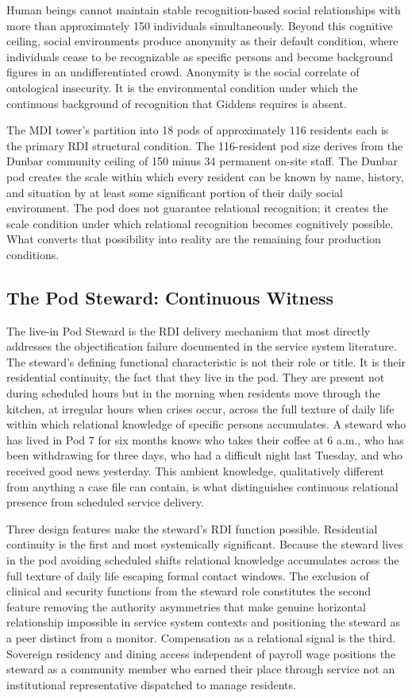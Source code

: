 \documentclass[12pt, letterpaper]{article}
\begin{document}
Human beings cannot maintain stable recognition-based social relationships with more than approximately 150 individuals simultaneously. Beyond this cognitive ceiling, social environments produce anonymity as their default condition, where individuals cease to be recognizable as specific persons and become background figures in an undifferentiated crowd. Anonymity is the social correlate of ontological insecurity. It is the environmental condition under which the continuous background of recognition that Giddens requires is absent.

The MDI tower's partition into 18 pods of approximately 116 residents each is the primary RDI structural condition. The 116-resident pod size derives from the Dunbar community ceiling of 150 minus 34 permanent on-site staff. The Dunbar pod creates the scale within which every resident can be known by name, history, and situation by at least some significant portion of their daily social environment. The pod does not guarantee relational recognition; it creates the scale condition under which relational recognition becomes cognitively possible. What converts that possibility into reality are the remaining four production conditions.

\subsection{The Pod Steward: Continuous Witness}

The live-in Pod Steward is the RDI delivery mechanism that most directly addresses the objectification failure documented in the service system literature. The steward's defining functional characteristic is not their role or title. It is their residential continuity, the fact that they live in the pod. They are present not during scheduled hours but in the morning when residents move through the kitchen, at irregular hours when crises occur, across the full texture of daily life within which relational knowledge of specific persons accumulates. A steward who has lived in Pod 7 for six months knows who takes their coffee at 6 a.m., who has been withdrawing for three days, who had a difficult night last Tuesday, and who received good news yesterday. This ambient knowledge, qualitatively different from anything a case file can contain, is what distinguishes continuous relational presence from scheduled service delivery.

Three design features make the steward's RDI function possible. Residential continuity is the first and most systemically significant. Because the steward lives in the pod avoiding scheduled shifts relational knowledge accumulates across the full texture of daily life escaping formal contact windows. The exclusion of clinical and security functions from the steward role constitutes the second feature removing the authority asymmetries that make genuine horizontal relationship impossible in service system contexts and positioning the steward as a peer distinct from a monitor. Compensation as a relational signal is the third. Sovereign residency and dining access independent of payroll wage positions the steward as a community member who earned their place through service not an institutional representative dispatched to manage residents.
\end{document}
